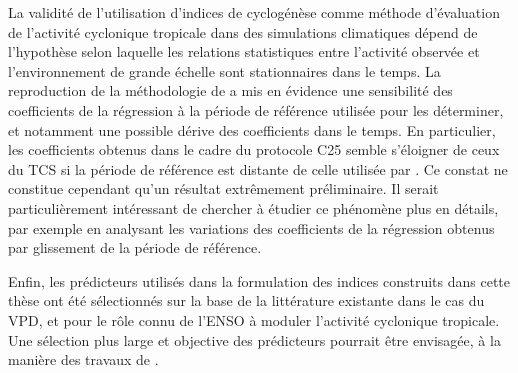 \documentclass[../main.tex]{subfiles}
\begin{document}
La validité de l'utilisation d'indices de cyclogénèse comme méthode d'évaluation de l'activité cyclonique tropicale dans des simulations climatiques dépend de
l'hypothèse selon laquelle les relations statistiques entre l'activité observée et l'environnement de grande échelle sont stationnaires dans le temps. La
reproduction de la méthodologie de \textcite{tippett_poisson_2011} a mis en évidence une sensibilité des coefficients de la régression à la période de référence
utilisée pour les déterminer, et notamment une possible dérive des coefficients dans le temps. En particulier, les coefficients obtenus dans le cadre du
protocole C25 semble s'éloigner de ceux du TCS si la période de référence est distante de celle utilisée par \textcite{tippett_poisson_2011}. Ce constat ne
constitue cependant qu'un résultat extrêmement préliminaire. Il serait particulièrement intéressant de chercher à étudier ce phénomène plus en détails, par
exemple en analysant les variations des coefficients de la régression obtenus par glissement de la période de référence.

Enfin, les prédicteurs utilisés dans la formulation des indices construits dans cette thèse ont été sélectionnés sur la base de la littérature existante dans le
cas du VPD, et pour le rôle connu de l'ENSO à moduler l'activité cyclonique tropicale. Une sélection plus large et objective des prédicteurs pourrait être
envisagée, à la manière des travaux de \textcite{wang_dynamic_2020}.
\end{document}
